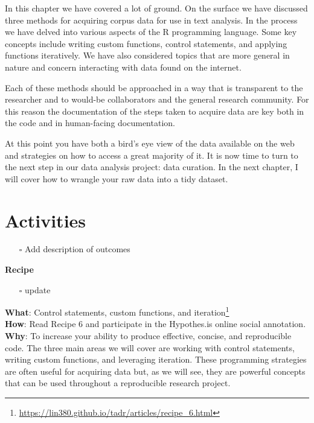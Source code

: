 \documentclass[
  letterpaper,
  DIV=11,
  numbers=noendperiod]{scrreport}
\providecommand{\tightlist}{%
  \setlength{\itemsep}{0pt}\setlength{\parskip}{0pt}}\usepackage{longtable,booktabs,array}
\theoremstyle{definition}
\theoremstyle{remark}
\DeclareRobustCommand{\href}[2]{#2\footnote{\url{#1}}}
\begin{document}

In this chapter we have covered a lot of ground. On the surface we have
discussed three methods for acquiring corpus data for use in text
analysis. In the process we have delved into various aspects of the R
programming language. Some key concepts include writing custom
functions, control statements, and applying functions iteratively. We
have also considered topics that are more general in nature and concern
interacting with data found on the internet.

Each of these methods should be approached in a way that is transparent
to the researcher and to would-be collaborators and the general research
community. For this reason the documentation of the steps taken to
acquire data are key both in the code and in human-facing documentation.

At this point you have both a bird's eye view of the data available on
the web and strategies on how to access a great majority of it. It is
now time to turn to the next step in our data analysis project: data
curation. In the next chapter, I will cover how to wrangle your raw data
into a tidy dataset.

\hypertarget{activities-3}{%
\section*{Activities}\label{activities-3}}


\begin{itemize}
\tightlist
\item[$\square$]
   Add description of outcomes
\end{itemize}

\begin{tcolorbox}[enhanced jigsaw, breakable, arc=.35mm, leftrule=.75mm, rightrule=.15mm, colback=white, toprule=.15mm, bottomrule=.15mm, opacityback=0, left=2mm]

\textbf{ Recipe}

\begin{itemize}
\tightlist
\item[$\square$]
   update
\end{itemize}

\textbf{What}:
\href{https://lin380.github.io/tadr/articles/recipe_6.html}{Control
statements, custom functions, and iteration}\\
\textbf{How}: Read Recipe 6 and participate in the Hypothes.is online
social annotation.\\
\textbf{Why}: To increase your ability to produce effective, concise,
and reproducible code. The three main areas we will cover are working
with control statements, writing custom functions, and leveraging
iteration. These programming strategies are often useful for acquiring
data but, as we will see, they are powerful concepts that can be used
throughout a reproducible research project.

\end{tcolorbox}
\end{document}
